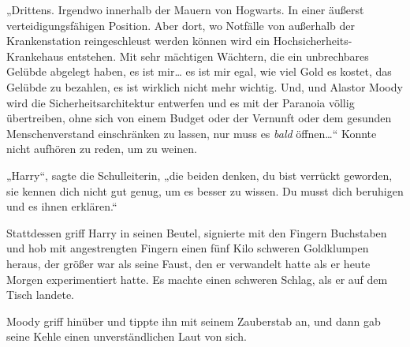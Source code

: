 „Drittens. Irgendwo innerhalb der Mauern von Hogwarts. In einer äußerst verteidigungsfähigen Position. Aber dort, wo Notfälle von außerhalb der Krankenstation reingeschleust werden können wird ein Hochsicherheits-Krankehaus entstehen. Mit sehr mächtigen Wächtern, die ein unbrechbares Gelübde abgelegt haben, es ist mir… es ist mir egal, wie viel Gold es kostet, das Gelübde zu bezahlen, es ist wirklich nicht mehr wichtig. Und, und Alastor Moody wird die Sicherheitsarchitektur entwerfen und es mit der Paranoia völlig übertreiben, ohne sich von einem Budget oder der Vernunft oder dem gesunden Menschenverstand einschränken zu lassen, nur muss es \emph{bald} öffnen…“ Konnte nicht aufhören zu reden, um zu weinen.

„Harry“, sagte die Schulleiterin, „die beiden denken, du bist verrückt geworden, sie kennen dich nicht gut genug, um es besser zu wissen. Du musst dich beruhigen und es ihnen erklären.“

Stattdessen griff Harry in seinen Beutel, signierte mit den Fingern Buchstaben und hob mit angestrengten Fingern einen fünf Kilo schweren Goldklumpen heraus, der größer war als seine Faust, den er verwandelt hatte als er heute Morgen experimentiert hatte. Es machte einen schweren Schlag, als er auf dem Tisch landete.

Moody griff hinüber und tippte ihn mit seinem Zauberstab an, und dann gab seine Kehle einen unverständlichen Laut von sich.

